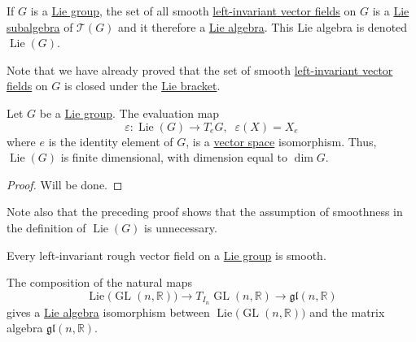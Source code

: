 \documentclass{article}
\DeclareMathOperator{\GL}{GL}
\DeclareMathOperator{\Lie}{Lie}
\newcounter{theorem}[section]
\newcounter{definition}[section]
\begin{document}
    \begin{definition}
      \label{def:lie-algebra-of-a-lie-group}
      If $G$ is a \hyperref[def:lie-group]{Lie group}, the set of all smooth \hyperref[def:left-invariant-vector-field]{left-invariant vector fields} on $G$ is a \hyperref[def:lie-subalgebra]{Lie subalgebra} of $\mathcal{T}(G)$ and it therefore a \hyperref[def:lie-algebra]{Lie algebra}. This Lie algebra is denoted $\Lie(G)$.
    \end{definition}

    Note that we have already proved that the set of smooth \hyperref[def:left-invariant-vector-field]{left-invariant vector fields} on $G$ is closed under the \hyperref[def:lie-bracket]{Lie bracket}. 

    \begin{theorem}
      \label{thm:evaluation-at-the-identity-is-an-isomorphism}
      Let $G$ be a \hyperref[def:lie-group]{Lie group}. The evaluation map 
      \begin{equation}
        \varepsilon: \Lie(G) \to T_e G, \;\; \varepsilon(X) = X_e
      \end{equation}
      where $e$ is the identity element of $G$, is a \hyperref[lin-def:vector-space]{vector space} isomorphism. Thus, $\Lie(G)$ is finite dimensional, with dimension equal to $\dim{G}$. 
    \end{theorem}
    \begin{proof}
      Will be done. 
    \end{proof}

    Note also that the preceding proof shows that the assumption of smoothness in the definition of $\Lie(G)$ is unnecessary. 

    \begin{corollary}
      \label{thm:left-invariant-rough-vector-fields-are-smooth}
      Every left-invariant rough vector field on a \hyperref[def:lie-group]{Lie group} is smooth. 
    \end{corollary}

    \begin{theorem}
      \label{thm:lie-algebra-of-the-general-linear-group}
      The composition of the natural maps
      \begin{equation}
        \Lie \big( \GL(n, \mathbb{R}) \big) \rightarrow T_{I_n} \GL(n, \mathbb{R}) \rightarrow \mathfrak{gl}(n, \mathbb{R})
      \end{equation}
      gives a \hyperref[def:lie-algebra]{Lie algebra} isomorphism between $\Lie\big(\GL(n, \mathbb{R})\big)$ and the matrix algebra $\mathfrak{gl}(n, \mathbb{R})$. 
    \end{theorem}
\end{document}
